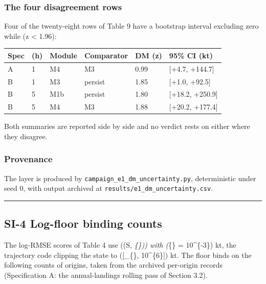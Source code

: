 \documentclass[11pt]{article}
\begin{document}
\subsubsection{The four disagreement
rows}\label{the-four-disagreement-rows}

Four of the twenty-eight rows of Table 9 have a bootstrap interval
excluding zero while (\textbar z\textbar{} \textless{} 1.96):

{\def\LTcaptype{none} %
\begin{longtable}[]{@{}llllll@{}}
\toprule\noalign{}
Spec & (h) & Module & Comparator & DM (z) & 95\% CI (kt) \\
\midrule\noalign{}
\endhead
\bottomrule\noalign{}
\endlastfoot
A & 1 & M4 & M3 & 0.99 & {[}+4.7, +144.7{]} \\
B & 1 & M3 & persist & 1.85 & {[}+1.0, +92.5{]} \\
B & 5 & M1b & persist & 1.80 & {[}+18.2, +250.9{]} \\
B & 5 & M4 & M3 & 1.88 & {[}+20.2, +177.4{]} \\
\end{longtable}
}

Both summaries are reported side by side and no verdict rests on either
where they disagree.

\subsubsection{Provenance}\label{provenance}

The layer is produced by \texttt{campaign\_e1\_dm\_uncertainty.py},
deterministic under seed 0, with output archived at
\texttt{results/e1\_dm\_uncertainty.csv}.

\begin{center}\rule{0.5\linewidth}{0.5pt}\end{center}

\subsection{SI-4 Log-floor binding
counts}\label{si-4-log-floor-binding-counts}

The log-RMSE scores of Table 4 use (\log\max(\hat S,
\varepsilon\emph{\{\})) with (\varepsilon}\{\} =
10\^{}\{-3\}) kt, the trajectory code clipping the state to
({[}\varepsilon\_\{\}, 10\^{}\{6\}{]}) kt. The floor binds
on the following counts of origins, taken from the archived per-origin
records (Specification A: the annual-landings rolling pass of Section
3.2).
\end{document}
